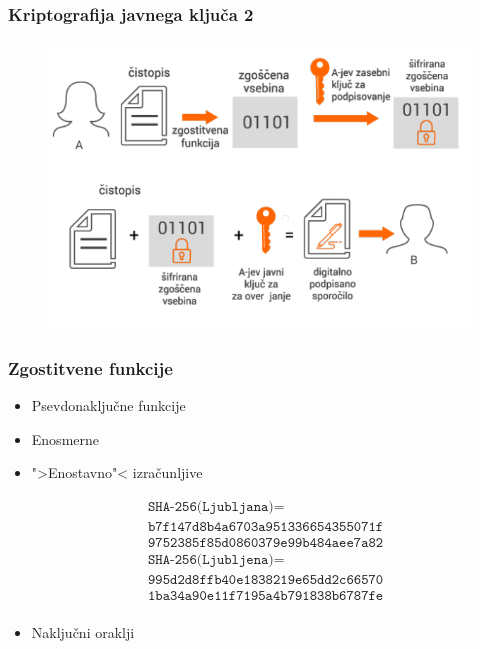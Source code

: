 \documentclass{beamer}    %
\begin{document}
\begin{frame}
    \frametitle{Kriptografija javnega ključa 2}
    \begin{figure}
        \includegraphics[width=\textwidth]{images/podpisovanje.png}
    \end{figure}
\end{frame}

\begin{frame}
    \frametitle{Zgostitvene funkcije}
    \begin{itemize}
        \item Psevdonaključne funkcije
        \item Enosmerne
        \item ">Enostavno"< izračunljive
    \end{itemize}
    \begin{align*}
        &\texttt{SHA-256(Ljubljana)} = \\
        &\texttt{b7f147d8b4a6703a951336654355071f} \\ 
        &\texttt{9752385f85d0860379e99b484aee7a82} \\
        &\texttt{SHA-256(Ljubljena)} = \\
        &\texttt{995d2d8ffb40e1838219e65dd2c66570} \\
        &\texttt{1ba34a90e11f7195a4b791838b6787fe} \\ 
    \end{align*}
    \begin{itemize}
        \item Naključni oraklji
    \end{itemize}
\end{frame}
\end{document}
